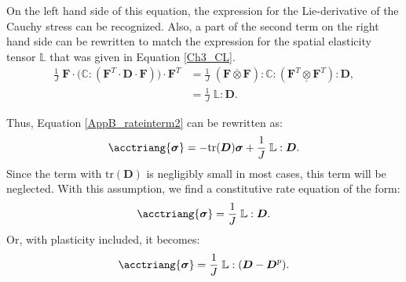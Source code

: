 On the left hand side of this equation, the expression for the Lie-derivative of the Cauchy stress can be recognized. Also, a part of the second term on the right hand side can be rewritten to match the expression for the spatial elasticity tensor $\boldsymbol{\mathbb L}$ that was given in Equation \ref{Ch3_CL}. 
\begin{equation}
\begin{split}
\frac{1}{J}\;\boldsymbol{F}\cdot\Big(\boldsymbol{\mathbb C}:(\boldsymbol{F}^T\cdot\boldsymbol{D}\cdot\boldsymbol{F})\Big)\cdot\boldsymbol{F}^T &= \frac{1}{J}\;(\boldsymbol{F}\overline{\otimes}\boldsymbol{F}):\boldsymbol{\mathbb C}:(\boldsymbol{F}^T\underline{\otimes}\boldsymbol{F}^T):\boldsymbol{D}, \\
&= \frac{1}{J}\; \boldsymbol{\mathbb L}:\boldsymbol{D}.
\end{split}
\end{equation}



Thus, Equation \ref{AppB_rateinterm2} can be rewritten as:
\begin{equation}
\acctriang{\boldsymbol{\sigma}} = -\text{tr}(\boldsymbol{D})\boldsymbol{\sigma} + \frac{1}{J}\; \boldsymbol{\mathbb L}:\boldsymbol{D}.
\end{equation}
Since the term with $\text{tr}(\boldsymbol{D})$ is negligibly small in most cases, this term will be neglected. With this assumption, we find a constitutive rate equation of the form:
\begin{equation}\label{AppB_consteq1}
\acctriang{\boldsymbol{\sigma}} = \frac{1}{J}\; \boldsymbol{\mathbb L}:\boldsymbol{D}.
\end{equation} 
Or, with plasticity included, it becomes:
\begin{equation}\label{AppB_consteq}
\acctriang{\boldsymbol{\sigma}} = \frac{1}{J}\; \boldsymbol{\mathbb L}:(\boldsymbol{D}-\boldsymbol{D}^p).
\end{equation} 

\newpage
